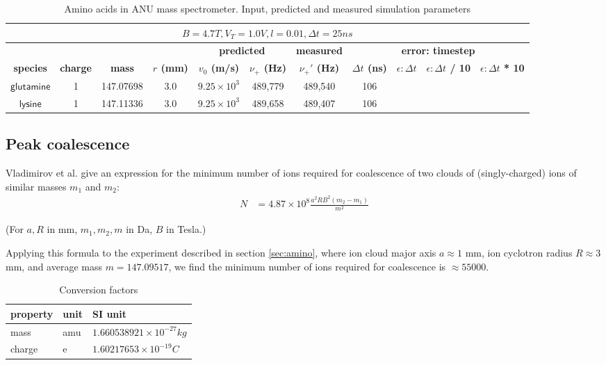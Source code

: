 \documentclass[10pt,conference,onecolumn]{IEEEtran}
\begin{document}
\begin{table}[htbp]
 \centering	  	  
 \caption{Amino acids in ANU mass spectrometer. Input, predicted and measured simulation parameters}
\label{tab:amino}
\begin{tabular}{c|c|c|c|c|c|c|c|c|c|c}
 \hline \hline
  \multicolumn{11}{|c|}{$B = 4.7 T, V_T = 1.0 V, l = 0.01, \Delta t = 25ns$} \\
 \hline \hline
 \multicolumn{4}{|c|}{ } & \multicolumn{2}{|c|}{\textbf{predicted}} & \textbf{measured} & \multicolumn{4}{|c|}{\textbf{error: timestep}} \\ 
 \hline
 \textbf{species} & \textbf{charge} & \textbf{mass} & \textbf{$r$ (mm)} & \textbf{$v_0$ (m/s)} & \textbf{$\nu_+$ (Hz)} & \textbf{$\nu_+'$ (Hz)} & \textbf{$\Delta t$ (ns)} & \textbf{$\epsilon: \Delta t$}& \textbf{$\epsilon: \Delta t$ / 10} & \textbf{$\epsilon: \Delta t$ * 10}\\ 
 \hline
 $\mathsf{glutamine}$ & 1 & 147.07698 & 3.0 & $9.25 \times 10^3$ & 489,779 & 489,540 & 106 & \\
 $\mathsf{lysine}$ & 1 & 147.11336 & 3.0 & $9.25 \times 10^3$ & 489,658 & 489,407 & 106 & \\
 \hline \hline
\end{tabular}
\end{table}

\subsection{Peak coalescence}

Vladimirov et al.\cite{Vladimirov2011} give an expression for the minimum number of ions required for coalescence of two clouds of (singly-charged) ions of similar masses $m_1$ and $m_2$:
\begin{align}
N &= 4.87 \times 10^8 \frac{a^2 R B^2 (m_2 - m_1)}{m^2}
\end{align}

(For $a,R$ in mm, $m_1 ,m_2, m$ in Da, $B$ in Tesla.)

Applying this formula to the experiment described in section \ref{sec:amino}, where ion cloud major axis $a \approx 1$ mm, ion cyclotron radius $R \approx 3$ mm, and average mass $m = 147.09517$, we find the minimum number of ions required for coalescence is $\approx 55000$.

\begin{table}[htbp]
 \centering	  	  
 \caption{Conversion factors}
\label{tab:conversion}
\begin{tabular}{l|l|l}
\hline \hline
\textbf{property} & \textbf{unit} & \textbf{SI unit} \\
\hline
mass & amu & $1.660538921 \times 10^{ - 27} kg$ \\
charge & e   & $1.60217653 \times 10^{ - 19} C$ \\
\hline \hline
\end{tabular}
\end{table}



\end{document}

